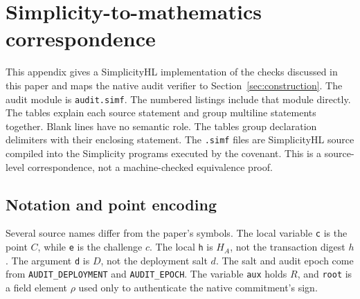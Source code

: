 \clearpage
\section{Simplicity-to-mathematics correspondence}
\label{app:code-math}

This appendix gives a SimplicityHL implementation of the checks discussed in this paper and maps the native audit verifier to Section~\ref{sec:construction}.
The audit module is \texttt{audit.simf}.
The numbered listings include that module directly.
The tables explain each source statement and group multiline statements together.
Blank lines have no semantic role. The tables group declaration delimiters with their enclosing statement.
The \texttt{.simf} files are SimplicityHL source compiled into the Simplicity programs executed by the covenant.
This is a source-level correspondence, not a machine-checked equivalence proof.

\newcommand{\auditlisting}[2]{%
}
\newcommand{\auditmap}[2]{\texttt{#1} & #2\\}
\newenvironment{auditmapping}{%
  \begingroup\small
  \renewcommand{\arraystretch}{1.12}%
  \begin{longtable}{@{}>{\raggedright\arraybackslash}p{.12\linewidth}>{\raggedright\arraybackslash}p{.85\linewidth}@{}}
  \toprule
  Source lines & Mathematical meaning or check\\
  \midrule
  \endhead
  \bottomrule
  \endfoot
}{%
  \end{longtable}\endgroup
}

\subsection{Notation and point encoding}

Several source names differ from the paper's symbols.
The local variable \texttt{c} is the point $C$, while \texttt{e} is the challenge $c$.
The local \texttt{h} is $H_A$, not the transaction digest $h$.
The argument \texttt{d} is $D$, not the deployment salt $d$. The salt and audit epoch come from \texttt{AUDIT\_DEPLOYMENT} and \texttt{AUDIT\_EPOCH}.
The variable \texttt{aux} holds $R$, and \texttt{root} is a field element $\rho$ used only to authenticate the native commitment's sign.

